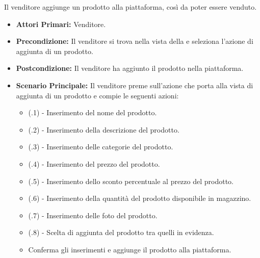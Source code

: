 

Il venditore aggiunge un prodotto alla piattaforma, così da poter essere venduto.
\begin{itemize}
    \item \textbf{Attori Primari:} Venditore.
    \item \textbf{Precondizione:} Il venditore si trova nella vista della  e seleziona l'azione di aggiunta di un prodotto.
    \item \textbf{Postcondizione:} Il venditore ha aggiunto il prodotto nella piattaforma.
    \item \textbf{Scenario Principale:} Il venditore preme sull'azione che porta alla vista di aggiunta di un prodotto e compie le seguenti azioni:
    \begin{itemize}
        \item (\actualUC.1) - Inserimento del nome del prodotto.
        \item (\actualUC.2) - Inserimento della descrizione del prodotto.
        \item (\actualUC.3) - Inserimento delle categorie del prodotto.
        \item (\actualUC.4) - Inserimento del prezzo del prodotto.
        \item (\actualUC.5) - Inserimento dello sconto percentuale al prezzo del prodotto.
        \item (\actualUC.6) - Inserimento della quantità del prodotto disponibile in magazzino.
        \item (\actualUC.7) - Inserimento delle foto del prodotto.
        \item (\actualUC.8) - Scelta di aggiunta del prodotto tra quelli in evidenza.
        \item Conferma gli inserimenti e aggiunge il prodotto alla piattaforma.
    \end{itemize}
\end{itemize}

